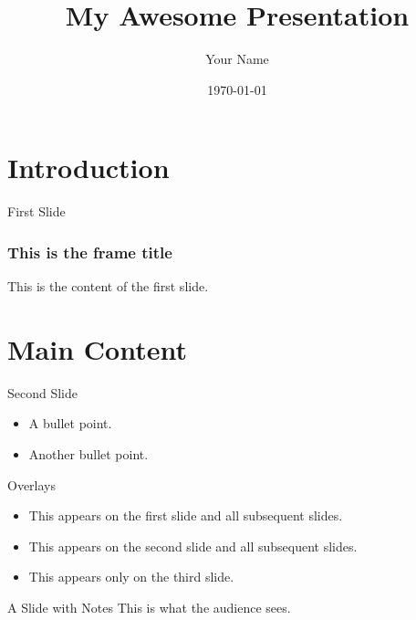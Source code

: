 \documentclass{beamer}
\title{My Awesome Presentation}
\author{Your Name}
\date{\today}
\begin{document}
\begin{frame}
  \titlepage
\end{frame}

\section{Introduction}

\begin{frame}{First Slide}
  \frametitle{This is the frame title}
  This is the content of the first slide.
\end{frame}

\section{Main Content}

\begin{frame}{Second Slide}
  \begin{itemize}
    \item A bullet point.
    \item Another bullet point.
  \end{itemize}
\end{frame}

\begin{frame}{Overlays}
  \begin{itemize}
    \item<1-> This appears on the first slide and all subsequent slides.
    \item<2-> This appears on the second slide and all subsequent slides.
    \item<3-> This appears only on the third slide.
  \end{itemize}
\end{frame}

\begin{frame}{A Slide with Notes}
  This is what the audience sees.
\end{frame}
\end{document}
